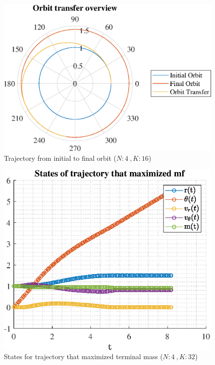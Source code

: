 \documentclass[]{article}
\begin{document}
	\begin{figure}
		\centering
		\includegraphics[scale=0.75]{orbit_N4_K16_C3_mf.eps}
		\caption{Trajectory from initial to final orbit (\(N:4\ , K:16\))}
		\label{fig:orbit_N4_K16_C3_mf}
	\end{figure}
	\begin{figure}
		\centering
		\includegraphics[scale=0.75]{states_N4_K32_C3_mf.eps}
		\caption{States for trajectory that maximized terminal mass (\(N:4\ , K:32\))}
		\label{fig:states_N4_K32_C3_mf}
	\end{figure}
\end{document}
